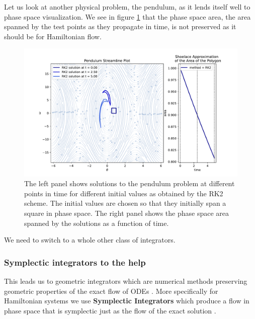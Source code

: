 Let us look at another physical problem, the pendulum, as it lends itself well to phase space visualization. We see in figure \ref{fig:pend_phase_rk2} that the phase space area, the area spanned by the test points as they propagate in time, is not preserved as it should be for Hamiltonian flow.

\begin{figure}[!htb]
  \centering
  \includegraphics[width=1\textwidth]{figures/phase_spaceB.pdf}\hfill
  \caption{The left panel shows solutions to the pendulum problem at different points in time for different initial values as obtained by the RK2 scheme. The initial values are chosen so that they initially span a square in phase space. The right panel shows the phase space area spanned by the solutions as a function of time.}
  \label{fig:pend_phase_rk2}
\end{figure}

We need to switch to a whole other class of integrators.

\subsubsection{Symplectic integrators to the help}
\label{sec:symplectic_integrators}

This leads us to geometric integrators which are numerical methods preserving geometric properties of the exact flow of ODEs \citep{Hairer06}. More specifically for Hamiltonian systems we use \textbf{Symplectic Integrators} which produce a flow in phase space that is symplectic just as the flow of the exact solution \citep[chapter VI]{Hairer06}.

